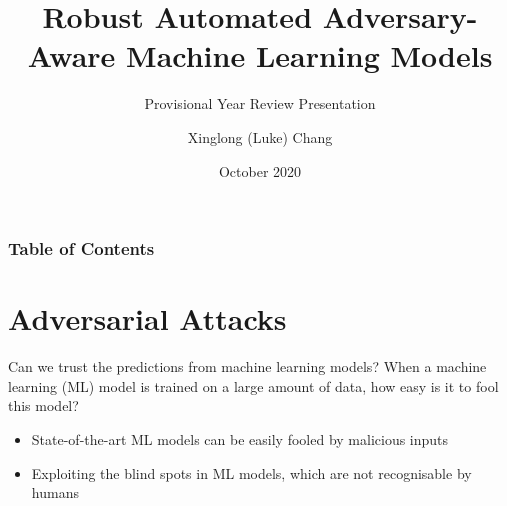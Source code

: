\documentclass[9pt]{beamer}
\title{Robust Automated Adversary-Aware Machine Learning Models}
\subtitle{Provisional Year Review Presentation}
\author{Xinglong (Luke) Chang}
\date{October 2020}
\institute
{
  School of Computer Science\\
  The University of Auckland
}
\begin{document}
\frame{\titlepage}

\begin{frame}
\frametitle{Table of Contents}
\tableofcontents
\end{frame}

\section{Adversarial Attacks}
\begin{frame}{Can we trust the predictions from machine learning models?}
When a machine learning (ML) model is trained on a large amount of data, how easy is it to fool this model?
\begin{itemize}
    \item State-of-the-art ML models can be easily fooled by malicious inputs
    \item Exploiting the blind spots in ML models, which are not recognisable by humans
\end{itemize}


\end{frame}
\end{document}
